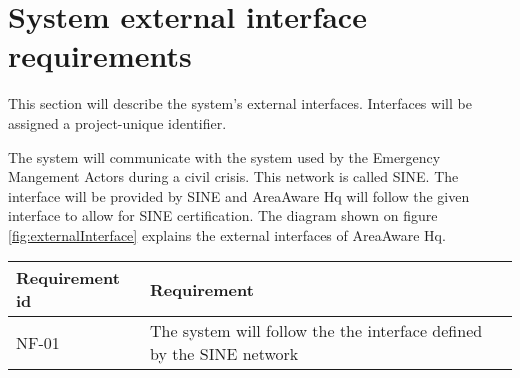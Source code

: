 \FloatBarrier
\newpage

\section{System external interface requirements}
This section will describe the system’s external interfaces. Interfaces will be assigned a project-unique identifier. 

The system will communicate with the system used by the Emergency Mangement Actors during a civil crisis. This network is called SINE. The interface will be provided by SINE and AreaAware Hq will follow the given interface to allow for SINE certification. The diagram shown on figure \ref{fig:externalInterface} explains the external interfaces of AreaAware Hq.


\begin{longtable}{| p{3.2cm} |  p{10cm} | }
	\hline
	\textbf{Requirement id} &  \textbf{Requirement } \\
	\hline
	NF-01 & The system will follow the the interface defined by the SINE network  \\
	\hline
\end{longtable}




